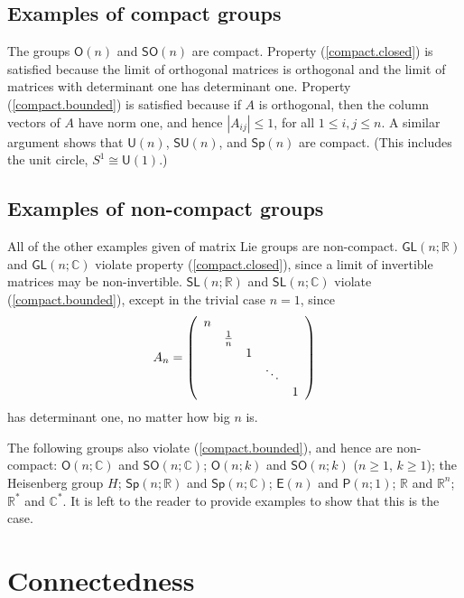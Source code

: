 \documentclass{amsbook}
\theoremstyle{plain}
\numberwithin{equation}{chapter}
\numberwithin{theorem}{chapter}
\begin{document}
\subsection{Examples of compact groups}

The groups $\mathsf{O}(n)$ and $\mathsf{SO}(n)$ are compact. Property
(\ref{compact.closed}) is satisfied because the limit of orthogonal matrices
is orthogonal and the limit of matrices with determinant one has determinant
one. Property (\ref{compact.bounded}) is satisfied because if $A$ is
orthogonal, then the column vectors of $A$ have norm one, and hence $\left|
A_{ij}\right|  \leq1$, for all $1\leq i,j\leq n$. A similar argument shows
that $\mathsf{U}(n)$, $\mathsf{SU}(n)$, and $\mathsf{Sp}(n)$ are compact.
(This includes the unit circle, $S^{1}\cong\mathsf{U}(1)$.)

\subsection{Examples of non-compact groups}

All of the other examples given of matrix Lie groups are non-compact.
$\mathsf{GL}(n;\mathbb{R})$ and $\mathsf{GL}(n;\mathbb{C})$ violate property
(\ref{compact.closed}), since a limit of invertible matrices may be
non-invertible. $\mathsf{SL}\left(  n;\mathbb{R}\right)  $ and $\mathsf{SL}%
\left(  n;\mathbb{C}\right)  $ violate (\ref{compact.bounded}), except in the
trivial case $n=1$, since
\[
A_{n}=\left(
\begin{array}
[c]{ccccc}%
n &  &  &  & \\
& \frac1n &  &  & \\
&  & 1 &  & \\
&  &  & \ddots & \\
&  &  &  & 1
\end{array}
\right)
\]
has determinant one, no matter how big $n$ is.

The following groups also violate (\ref{compact.bounded}), and hence are
non-compact: $\mathsf{O}(n;\mathbb{C})$ and $\mathsf{SO}(n;\mathbb{C})$;
$\mathsf{O}(n;k)$ and $\mathsf{SO}(n;k)$ ($n\geq1$, $k\geq1$); the Heisenberg
group $H$; $\mathsf{Sp}\left(  n;\mathbb{R}\right)  $ and $\mathsf{Sp}\left(
n;\mathbb{C}\right)  $; $\mathsf{E}(n)$ and $\mathsf{P}(n;1)$; $\mathbb{R}$
and $\mathbb{R}^{n}$; $\mathbb{R}^{*}$ and $\mathbb{C}^{*}$. It is left to the
reader to provide examples to show that this is the case.

\section{Connectedness}
\end{document}

